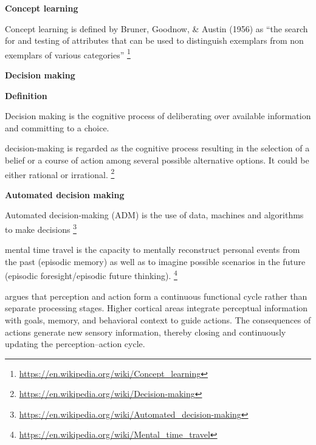 \documentclass{book}
\providecommand{\ProjectDeepHeading}[2]{%
    \par\medskip\noindent\textbf{#2}\par\smallskip
}
\providecommand{\seeherefooter}[1]{\footnote{\url{#1}}}
\begin{document}
\ProjectDeepHeading{5}{Concept learning}


Concept learning is defined by Bruner, Goodnow, \& Austin (1956) as ``the search for and testing of attributes that can be used to distinguish exemplars from non exemplars of various categories'' \seeherefooter{https://en.wikipedia.org/wiki/Concept_learning}

\ProjectDeepHeading{5}{Decision making}


\ProjectDeepHeading{8}{Definition}

\cite{gold-2007-the-neural-basis-of-decision-making}
Decision making is the cognitive process of deliberating over available information and committing to a choice.
    
    decision-making is regarded as the cognitive process resulting in the selection of a belief or a course of action among several possible alternative options. It could be either rational or irrational.
    \seeherefooter{https://en.wikipedia.org/wiki/Decision-making}
    
    \ProjectDeepHeading{8}{Automated decision making}
        Automated decision-making (ADM) is the use of data, machines and algorithms to make decisions
        \seeherefooter{https://en.wikipedia.org/wiki/Automated_decision-making}


mental time travel is the capacity to mentally reconstruct personal events from the past (episodic memory) as well as to imagine possible scenarios in the future (episodic foresight/episodic future thinking). \seeherefooter{https://en.wikipedia.org/wiki/Mental_time_travel}


\cite{fuster-2004-upper-processing-stages-of-the-perception-action-cycle} argues that perception and action form a continuous functional cycle rather than separate processing stages. Higher cortical areas integrate perceptual information with goals, memory, and behavioral context to guide actions. The consequences of actions generate new sensory information, thereby closing and continuously updating the perception--action cycle.
    
\end{document}

